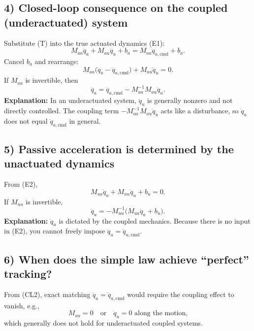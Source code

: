 \subsection*{4) Closed-loop consequence on the coupled (underactuated) system}
Substitute (T) into the true actuated dynamics (E1):
\begin{equation}
M_{aa}\ddot q_a + M_{au}\ddot q_u + b_a
=
M_{aa}\ddot q_{a,\mathrm{cmd}} + b_a.
\end{equation}
Cancel $b_a$ and rearrange:
\begin{equation}
M_{aa}\big(\ddot q_a - \ddot q_{a,\mathrm{cmd}}\big)
+ M_{au}\ddot q_u = 0.
\tag{CL1}
\end{equation}
If $M_{aa}$ is invertible, then
\begin{equation}
\ddot q_a
=
\ddot q_{a,\mathrm{cmd}}
-
M_{aa}^{-1}M_{au}\ddot q_u.
\tag{CL2}
\end{equation}
\noindent
\textbf{Explanation:} In an underactuated system, $\ddot q_u$ is generally nonzero and not directly controlled. The coupling term $-M_{aa}^{-1}M_{au}\ddot q_u$ acts like a disturbance, so $\ddot q_a$ does not equal $\ddot q_{a,\mathrm{cmd}}$ in general.

\subsection*{5) Passive acceleration is determined by the unactuated dynamics}
From (E2),
\begin{equation}
M_{ua}\ddot q_a + M_{uu}\ddot q_u + b_u = 0.
\end{equation}
If $M_{uu}$ is invertible,
\begin{equation}
\ddot q_u = -M_{uu}^{-1}\big(M_{ua}\ddot q_a + b_u\big).
\tag{U}
\end{equation}
\noindent
\textbf{Explanation:} $\ddot q_u$ is dictated by the coupled mechanics. Because there is no input in (E2), you cannot freely impose $\ddot q_u=\ddot q_{u,\mathrm{cmd}}$.

\subsection*{6) When does the simple law achieve ``perfect'' tracking?}
From (CL2), exact matching $\ddot q_a=\ddot q_{a,\mathrm{cmd}}$ would require the coupling effect to vanish, e.g.,
\begin{equation}
M_{au}=0 \quad \text{or} \quad \ddot q_u = 0 \text{ along the motion,}
\end{equation}
which generally does not hold for underactuated coupled systems.

